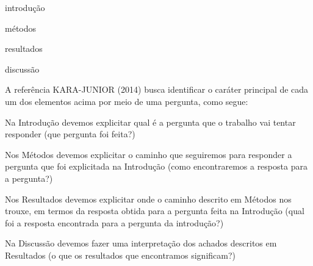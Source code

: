 \documentclass[
12pt,		%
openright,	%
twoside,  %
a4paper,			%
chapter=TITLE,		%
english,			%
french,				%
spanish,			%
brazil				%
]{USPSC-classe/USPSC_RedarTex}
\begin{document}
\begin{alineas}
\item introdu\c{c}\~ao
\item m\'etodos
\item resultados
\item discuss\~ao
\end{alineas}

A refer\^encia KARA-JUNIOR (2014) busca identificar o car\'ater principal de cada um dos elementos acima por meio de uma pergunta, como segue:











\begin{alineas}
\item Na Introdu\c{c}\~ao devemos explicitar qual \'e a pergunta que o trabalho vai tentar responder   (\textquotedbl que pergunta foi feita?\textquotedbl )
\item Nos M\'etodos devemos explicitar o caminho que seguiremos para responder a pergunta que foi explicitada na Introdu\c{c}\~ao (\textquotedbl como encontraremos a resposta para a pergunta?\textquotedbl )
\item Nos Resultados devemos explicitar onde o caminho descrito em M\'etodos nos trouxe, em termos da resposta obtida para a pergunta feita na Introdu\c{c}\~ao (\textquotedbl qual foi a resposta encontrada para a pergunta da introdu\c{c}\~ao?\textquotedbl )
\item Na Discuss\~ao devemos fazer uma interpreta\c{c}\~ao dos achados descritos em Resultados (\textquotedbl o que os resultados que encontramos significam?\textquotedbl )
\end{alineas}
\end{document}
